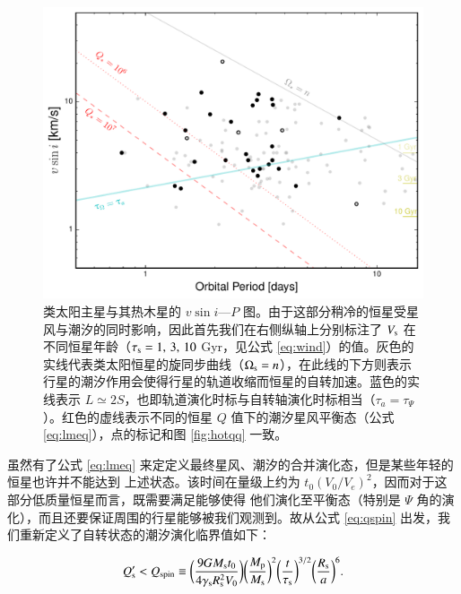 \begin{figure}[t]
\centering
\includegraphics[width=1.0\textwidth]{figures/chapter4/fig10a_cold.pdf}
\caption{类太阳主星与其热木星的 $v\sin i $---$P$ 图。由于这部分稍冷的恒星受星风与潮汐的同时影响，因此首先我们在右侧纵轴上分别标注了 $V_\mathrm{s}$ 在不同恒星年龄（$\tau_\mathrm{s} = 1,\,3,\,10$ Gyr，见公式 \ref{eq:wind}）的值。灰色的实线代表类太阳恒星的旋同步曲线（$\Omega_\mathrm{s} = n$），在此线的下方则表示行星的潮汐作用会使得行星的轨道收缩而恒星的自转加速。蓝色的实线表示 $L \simeq 2S$，也即轨道演化时标与自转轴演化时标相当（$\tau_a = \tau_\Psi$）。红色的虚线表示不同的恒星 $Q$ 值下的潮汐星风平衡态（公式 \ref{eq:lmeq}），点的标记和图 \ref{fig:hotqq} 一致。}
\label{fig:coldevo}
\end{figure}

虽然有了公式 \ref{eq:lmeq} 来定定义最终星风、潮汐的合并演化态，但是某些年轻的恒星也许并不能达到
上述状态。该时间在量级上约为 $t_0(V_0/V_e)^2$，因而对于这部分低质量恒星而言，既需要满足能够使得
他们演化至平衡态（特别是 $\Psi$ 角的演化），而且还要保证周围的行星能够被我们观测到。故从公式 
\ref{eq:qspin} 出发，我们重新定义了自转状态的潮汐演化临界值如下：

\begin{equation} \label{eq:lmqspin}
Q_\mathrm{s}^{\prime} < Q_\mathrm{spin} \equiv \bigg( 
\frac{9G M_\mathrm{s}t_0}{4 \gamma_\mathrm{s}R_\mathrm{s}^2V_0} \bigg) 
\bigg( \frac{M_\mathrm{p}}{M_\mathrm{s}} \bigg)^2  
\bigg( \frac{t}{\tau_\mathrm{s}} \bigg)^{3/2} \bigg( \frac{R_\mathrm{s}}{a} \bigg)^6.
\end{equation} 

